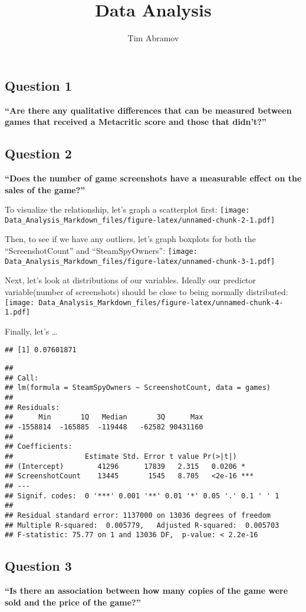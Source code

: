 \documentclass[]{article}
\title{Data Analysis}
\author{Tim Abramov}
\date{}
\begin{document}
\maketitle

\subsection{Question 1}\label{question-1}

\textbf{``Are there any qualitative differences that can be measured
between games that received a Metacritic score and those that didn't?''}

\subsection{Question 2}\label{question-2}

\textbf{``Does the number of game screenshots have a measurable effect
on the sales of the game?''}

To visualize the relationship, let's graph a scatterplot first:
\texttt{[image: Data\_Analysis\_Markdown\_files/figure-latex/unnamed-chunk-2-1.pdf]}

Then, to see if we have any outliers, let's graph boxplots for both the
``ScreenshotCount'' and ``SteamSpyOwners'':
\texttt{[image: Data\_Analysis\_Markdown\_files/figure-latex/unnamed-chunk-3-1.pdf]}

Next, let's look at distributions of our variables. Ideally our
predictor variable(number of screenshots) should be close to being
normally distributed:
\texttt{[image: Data\_Analysis\_Markdown\_files/figure-latex/unnamed-chunk-4-1.pdf]}

Finally, let's \ldots{}

\begin{verbatim}
## [1] 0.07601871
\end{verbatim}

\begin{verbatim}
## 
## Call:
## lm(formula = SteamSpyOwners ~ ScreenshotCount, data = games)
## 
## Residuals:
##      Min       1Q   Median       3Q      Max 
## -1558814  -165885  -119448   -62582 90431160 
## 
## Coefficients:
##                 Estimate Std. Error t value Pr(>|t|)    
## (Intercept)        41296      17839   2.315   0.0206 *  
## ScreenshotCount    13445       1545   8.705   <2e-16 ***
## ---
## Signif. codes:  0 '***' 0.001 '**' 0.01 '*' 0.05 '.' 0.1 ' ' 1
## 
## Residual standard error: 1137000 on 13036 degrees of freedom
## Multiple R-squared:  0.005779,   Adjusted R-squared:  0.005703 
## F-statistic: 75.77 on 1 and 13036 DF,  p-value: < 2.2e-16
\end{verbatim}

\subsection{Question 3}\label{question-3}

\textbf{``Is there an association between how many copies of the game
were sold and the price of the game?''}
\end{document}
